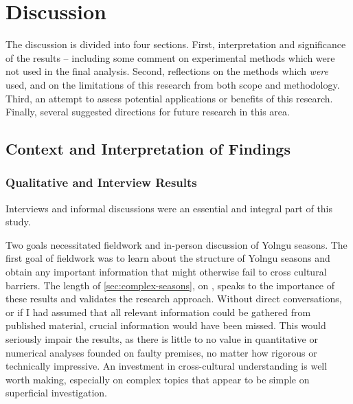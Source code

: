 \chapter{Discussion}
\label{ch:discussion}



The discussion is divided into four sections.  First, interpretation and
significance of the results -- including some comment on experimental methods
which were not used in the final analysis.  Second, reflections on the methods
which \emph{were} used, and on the limitations of this research from both
scope and methodology.  Third, an attempt to assess potential applications or
benefits of this research.  Finally, several suggested directions for future
research in this area.




\section{Context and Interpretation of Findings}
\label{sec:disc-results}

\subsection{Qualitative and Interview Results}

Interviews and informal discussions were an essential and integral part of
this study.

Two goals necessitated fieldwork and in-person discussion of Yolngu seasons.
The first goal of fieldwork  was to learn about the structure of Yolngu
seasons and obtain any important information that might otherwise
fail to cross cultural barriers.  The length of \cref{sec:complex-seasons},
on \textit{}, speaks to the importance of these
results and validates the research approach.
%
Without direct conversations, or if I had assumed that all relevant information
could be gathered from published material, crucial information would have been
missed.  This would seriously impair the results, as there is little to no value
in quantitative or numerical analyses
founded on faulty premises, no matter how rigorous or technically impressive.
An investment in cross-cultural understanding is well worth making, especially
on complex topics that appear to be simple on superficial investigation.

